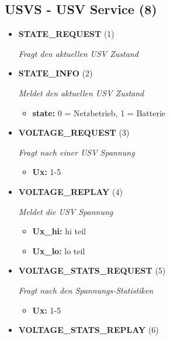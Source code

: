 \subsection{USVS - USV Service (8)}
\begin{itemize}
		
\item \textbf{STATE\_REQUEST} (1)

\textit{Fragt den aktuellen USV Zustand}

\item \textbf{STATE\_INFO} (2)

\textit{Meldet den aktuellen USV Zustand}

\small
\begin{itemize}
		
\item \textbf{state:} 0 = Netzbetrieb, 1 = Batterie
\end{itemize}
\normalsize
	
\item \textbf{VOLTAGE\_REQUEST} (3)

\textit{Fragt nach einer USV Spannung}

\small
\begin{itemize}
		
\item \textbf{Ux:} 1-5
\end{itemize}
\normalsize
	
\item \textbf{VOLTAGE\_REPLAY} (4)

\textit{Meldet die USV Spannung}

\small
\begin{itemize}
		
\item \textbf{Ux\_hi:} hi teil
\item \textbf{Ux\_lo:} lo teil
\end{itemize}
\normalsize
	
\item \textbf{VOLTAGE\_STATS\_REQUEST} (5)

\textit{Fragt nach den Spannungs-Statistiken}

\small
\begin{itemize}
		
\item \textbf{Ux:} 1-5
\end{itemize}
\normalsize
	
\item \textbf{VOLTAGE\_STATS\_REPLAY} (6)


\end{itemize}
